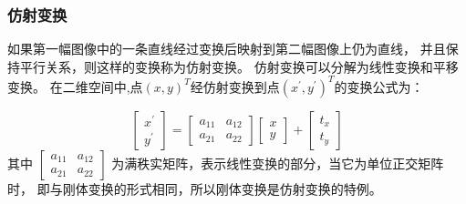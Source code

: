 \subsubsection{仿射变换}
如果第一幅图像中的一条直线经过变换后映射到第二幅图像上仍为直线，
并且保持平行关系，则这样的变换称为仿射变换。
仿射变换可以分解为线性变换和平移变换。
在二维空间中,点$(x,y)^T$经仿射变换到点$(x^\prime,y^\prime)^T$的变换公式为：


\begin{equation}
  \begin{bmatrix}
    x^\prime\\
    y^\prime
  \end{bmatrix}=
  \begin{bmatrix}
    a_{11}& a_{12}\\
    a_{21}& a_{22}
  \end{bmatrix}
  \begin{bmatrix}
    x\\
    y
  \end{bmatrix}+
  \begin{bmatrix}
    t_x\\
    t_y
  \end{bmatrix}
\end{equation}
其中
$\begin{bmatrix}
a_{11}& a_{12}\\ a_{21}& a_{22} 
\end{bmatrix}$
为满秩实矩阵，表示线性变换的部分，当它为单位正交矩阵时，
即与刚体变换的形式相同，所以刚体变换是仿射变换的特例。
